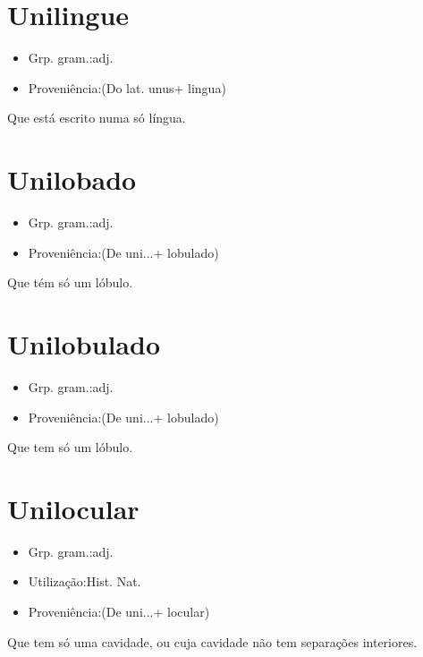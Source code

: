 \documentclass{article}
\begin{document}
\section{Unilingue}
\begin{itemize}
\item {Grp. gram.:adj.}
\end{itemize}
\begin{itemize}
\item {Proveniência:(Do lat. \textunderscore unus\textunderscore  + \textunderscore lingua\textunderscore )}
\end{itemize}
Que está escrito numa só língua.
\section{Unilobado}
\begin{itemize}
\item {Grp. gram.:adj.}
\end{itemize}
\begin{itemize}
\item {Proveniência:(De \textunderscore uni...\textunderscore  + \textunderscore lobulado\textunderscore )}
\end{itemize}
Que tém só um lóbulo.
\section{Unilobulado}
\begin{itemize}
\item {Grp. gram.:adj.}
\end{itemize}
\begin{itemize}
\item {Proveniência:(De \textunderscore uni...\textunderscore  + \textunderscore lobulado\textunderscore )}
\end{itemize}
Que tem só um lóbulo.
\section{Unilocular}
\begin{itemize}
\item {Grp. gram.:adj.}
\end{itemize}
\begin{itemize}
\item {Utilização:Hist. Nat.}
\end{itemize}
\begin{itemize}
\item {Proveniência:(De \textunderscore uni...\textunderscore  + \textunderscore locular\textunderscore )}
\end{itemize}
Que tem só uma cavidade, ou cuja cavidade não tem separações interiores.
\end{document}
